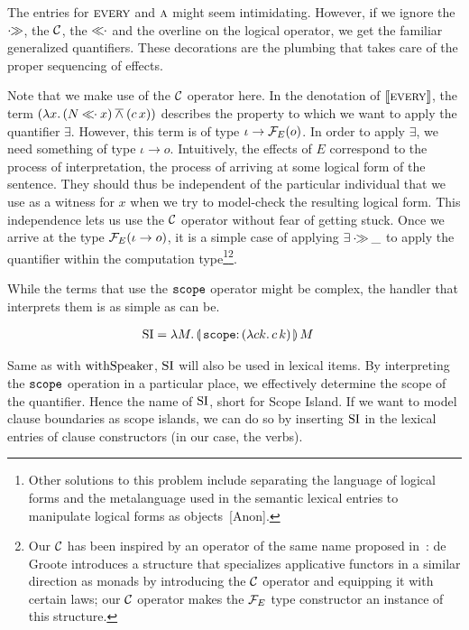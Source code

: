 \documentclass{llncs}
\begin{document}
The entries for $\textsc{every}$ and $\textsc{a}$ might seem
intimidating. However, if we ignore the $\mathbin{\cdot\!\!\gg}$, the $\mathcal{C}$, the $\mathbin{\ll\!\!\cdot}$ and
the overline on the logical operator, we get the familiar generalized
quantifiers. These decorations are the plumbing that takes care of the
proper sequencing of effects.

Note that we make use of the $\mathcal{C}$ operator here. In the denotation of
$\llbracket \textsc{every} \rrbracket$, the term $(\lambda x.\, (N \mathbin{\ll\!\!\cdot} x) \mathbin{\overline{\land}} (c\,x))$
describes the property to which we want to apply the quantifier
$\exists$. However, this term is of type $\iota \to \mathcal{F}_E(o)$. In order to
apply $\exists$, we need something of type $\iota \to o$. Intuitively, the
effects of $E$ correspond to the process of interpretation, the process of
arriving at some logical form of the sentence. They should thus be
independent of the particular individual that we use as a witness for $x$
when we try to model-check the resulting logical form. This independence
lets us use the $\mathcal{C}$ operator without fear of getting stuck. Once we
arrive at the type $\mathcal{F}_E(\iota \to o)$, it is a simple case of applying
$\exists \mathbin{\cdot\!\!\gg} \_$ to apply the quantifier within the computation
type\footnote{Other solutions to this problem include separating the
  language of logical forms and the metalanguage used in the semantic
  lexical entries to manipulate logical forms as
  objects~[Anon]\cite{kiselyov2015applicative}.}\footnote{Our
  $\mathcal{C}$ has been inspired by an operator of the same name proposed
  in~\cite{de2015conservativity}: de Groote introduces a structure that
  specializes applicative functors in a similar direction as monads by
  introducing the $\mathcal{C}$ operator and equipping it with certain laws; our
  $\mathcal{C}$ operator makes the $\mathcal{F}_E$ type constructor an instance of this
  structure.}.

While the terms that use the $\mathtt{scope}$ operator might be complex, the
handler that interprets them is as simple as can be.

\begin{align*}
  \SI &= \lam{M}{\ap{\banana{\onto{\op{scope}}{(\lam{c k}{\ap{c}{k}})}}}{M}}
\end{align*}

Same as with $\operatorname{withSpeaker}$, $\operatorname{SI}$ will also be used in lexical items. By
interpreting the $\mathtt{scope}$ operation in a particular place, we
effectively determine the scope of the quantifier. Hence the name of $\operatorname{SI}$,
short for Scope Island. If we want to model clause boundaries as scope
islands, we can do so by inserting $\operatorname{SI}$ in the lexical entries of clause
constructors (in our case, the verbs).
\end{document}
